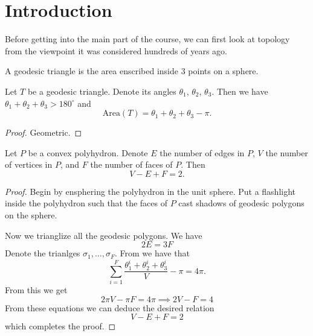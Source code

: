 \documentclass[11pt,a4paper]{article}
\begin{document}
\maketitle


\newpage
\tableofcontents
\newpage

\section{Introduction}

Before getting into the main part of the course, we can first look
at topology from the viewpoint it was considered hundreds of years ago.

\begin{definition}
  A geodesic triangle is the area enscribed inside $3$ points
  on a sphere.
\end{definition}

\begin{theorem}
  \label{thm:girard}
  Let $T$ be a geodesic triangle.
  Denote its angles $\theta_1$, $\theta_2$, $\theta_3$.
  Then we have $\theta_1 + \theta_2 + \theta_3 > 180^{\circ}$ and
  \[
    \mathrm{Area}(T) = \theta_1 + \theta_2 + \theta_3 - \pi.
  \]
\end{theorem}
\begin{proof}
  Geometric.
\end{proof}

\begin{theorem}
  Let $P$ be a convex polyhydron.
  Denote $E$ the number of edges in $P$, $V$ the number of vertices in $P$,
  and $F$ the number of faces of $P$.
  Then
  \[
    V - E + F = 2.
  \]
\end{theorem}
\begin{proof}
  Begin by ensphering the polyhydron in the unit sphere.
  Put a flashlight inside the polyhydron such that the faces of $P$
  cast shadows of geodesic polygons on the sphere.
  
  Now we trianglize all the geodesic polygons.
  We have
  \[
    \boxed{2 E = 3 F}
  \]
  Denote the trianlges $\sigma_1,\dots,\sigma_F$.
  From  we have that
  \[
    \sum_{i=1}^{F} \frac{\theta_1^i + \theta_2^i + \theta_3^i}{V} - \pi =
    4 \pi.
  \]
  From this we get
  \[
    2 \pi V - \pi F = 4 \pi \implies
    \boxed{2 V - F = 4}
  \]
  From these equations we can deduce the desired relation
  \[
    \boxed{V - E + F = 2}
  \]
  which completes the proof.
\end{proof}
\end{document}
